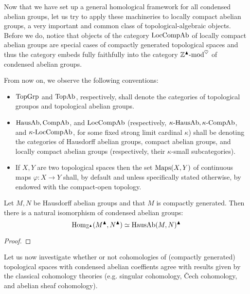             Now that we have set up a general homological framework for all condensed abelian groups, let us try to apply these machineries to locally compact abelian groups, a very important and common class of topological-algebraic objects. Before we do, notice that objects of the category $\mathrm{Loc}\mathrm{Comp}\mathrm{Ab}$ of locally compact abelian groups are special cases of compactly generated topological spaces and thus the category embeds fully faithfully into the category $\mathbb{Z}^{\blacktriangle}\text{-}\mathrm{mod}^{\heartsuit}$ of condensed abelian groups. 
            \begin{convention}
                From now on, we observe the following conventions:
                    \begin{itemize}
                        \item $\mathrm{Top}\mathrm{Grp}$ and $\mathrm{Top}\mathrm{Ab}$, respectively, shall denote the categories of topological groupos and topological abelian groups.
                        \item $\mathrm{Haus}\mathrm{Ab}, \mathrm{Comp}\mathrm{Ab}$, and $\mathrm{Loc}\mathrm{Comp}\mathrm{Ab}$ (respectively, $\kappa\text{-}\mathrm{Haus}\mathrm{Ab}, \kappa\text{-}\mathrm{Comp}\mathrm{Ab}$, and $\kappa\text{-}\mathrm{Loc}\mathrm{Comp}\mathrm{Ab}$, for some fixed strong limit cardinal $\kappa$) shall be denoting the categories of Hausdorff abelian groups, compact abelian groups, and locally compact abelian groups (respectively, their $\kappa$-small subcategories). 
                        \item If $X, Y$ are two topological spaces then the set $\mathrm{Maps}(X, Y)$ of continuous maps $\varphi: X \to Y$ shall, by default and unless specifically stated otherwise, by endowed with the compact-open topology. 
                    \end{itemize}
            \end{convention}
            \begin{lemma} \label{lemma: condensing_hom_sets_between_hausdorff_abelian_groups}
                Let $M, N$ be Hausdorff abelian groups and that $M$ is compactly generated. Then there is a natural isomorphism of condensed abelian groups:
                    $$\mathrm{Hom}_{\mathbb{Z}^{\blacktriangle}}(M^{\blacktriangle}, N^{\blacktriangle}) \simeq \mathrm{Haus}\mathrm{Ab}(M, N)^{\blacktriangle}$$
            \end{lemma}
                \begin{proof}
                    
                \end{proof}
                
            Let us now investigate whether or not cohomologies of (compactly generated) topological spaces with condensed abelian coeffients agree with results given by the classical cohomology theories (e.g. singular cohomology, \v{C}ech cohomology, and abelian sheaf cohomology).
        
